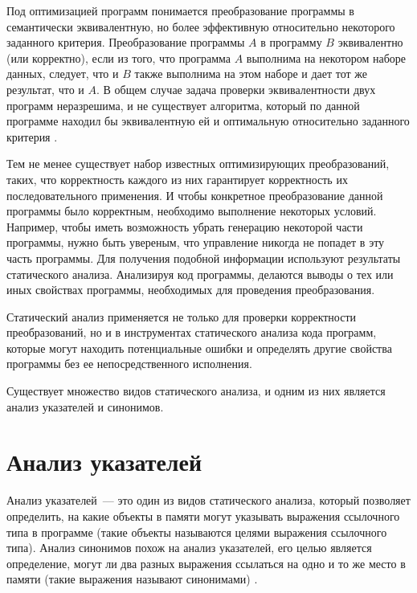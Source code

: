 \documentclass[14pt,titlepage]{extarticle}
\let\oldsection\section
\renewcommand{\section}{\newpage\oldsection}
\begin{document}
    Под оптимизацией программ понимается преобразование программы в
    семантически эквивалентную, но более эффективную относительно некоторого
    заданного критерия.
    Преобразование программы $A$ в программу $B$ эквивалентно (или корректно),
    если из того, что программа $A$ выполнима на некотором наборе данных,
    следует, что и $B$ также выполнима на этом наборе и дает тот же результат,
    что и $A$.
    В общем случае задача проверки эквивалентности двух программ неразрешима,
    и не существует алгоритма, который по данной программе находил бы
    эквивалентную ей и оптимальную относительно заданного критерия
    \cite{kasjanov_translators}.

    Тем не менее существует набор известных оптимизирующих преобразований,
    таких, что корректность каждого из них гарантирует корректность их
    последовательного применения.
    И чтобы конкретное преобразование данной программы было корректным,
    необходимо выполнение некоторых условий. Например, чтобы иметь
    возможность убрать генерацию некоторой части программы, нужно быть
    увереным, что управление никогда не попадет в эту часть программы.
    Для получения подобной информации используют результаты статического
    анализа. Анализируя код программы, делаются выводы о тех или иных свойствах
    программы, необходимых для проведения преобразования.

    Статический анализ применяется не только для проверки
    корректности преобразований, но и в инструментах статического анализа
    кода программ, которые могут находить потенциальные ошибки и определять
    другие свойства программы без ее непосредственного исполнения.

    Существует множество видов статического анализа, и одним из них
    является анализ указателей и синонимов.

  \section{Анализ указателей}

    Анализ указателей~--- это один из видов статического анализа, который
    позволяет определить, на какие объекты в памяти могут указывать выражения
    ссылочного типа в программе (такие объекты называются целями выражения
    ссылочного типа). Анализ синонимов похож на анализ указателей, его целью
    является определение, могут ли два разных выражения ссылаться на одно и
    то же место в памяти (такие выражения называют синонимами)
    \cite{andersen}.
\end{document}
